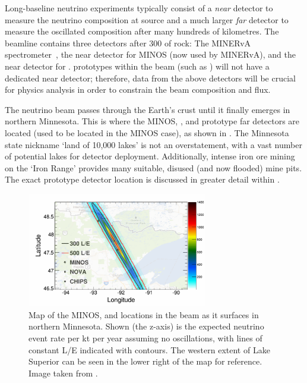 Long-baseline neutrino experiments typically consist of a \emph{near} detector to measure the
neutrino composition at source and a much larger \emph{far} detector to measure the oscillated
composition after many hundreds of kilometres. The \numi beamline contains three detectors after
\SI{300}{} of rock: The MINERvA spectrometer~\cite{mcfarland2006}, the near detector for
MINOS (now used by MINERvA), and the near detector for \nova. \chips prototypes within the \numi
beam (such as \chipsfive) will not have a dedicated near detector; therefore, data from the above
detectors will be crucial for physics analysis in order to constrain the beam composition and
flux.

The \numi neutrino beam passes through the Earth's crust until it finally emerges in northern
Minnesota. This is where the MINOS, \nova, and prototype \chips far detectors are located (used to
be located in the MINOS case), as shown in . The Minnesota state nickname
`land of 10,000 lakes' is not an overstatement, with a vast number of potential lakes for \chips
detector deployment. Additionally, intense iron ore mining on the `Iron Range' provides many
suitable, disused (and now flooded) mine pits. The exact \chipsfive prototype detector location is
discussed in greater detail within .

\begin{figure} %
    \includegraphics[width=0.7\textwidth]{diagrams/4-chips/numi_map.pdf}
    \caption[Map of detector locations in the \numi beam]
    {Map of the MINOS, \nova and \chips locations in the \numi beam as it surfaces in northern
        Minnesota. Shown (the z-axis) is the expected neutrino event rate per kt per year assuming
        no oscillations, with lines of constant L/E indicated with contours. The western extent of
        Lake Superior can be seen in the lower right of the map for reference. Image taken from
        .}
    \label{fig:numi_map}
\end{figure}

